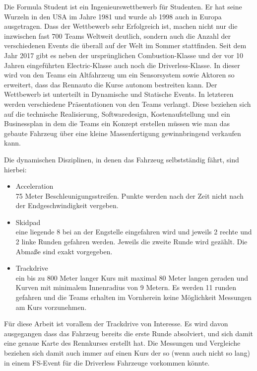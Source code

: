 \documentclass{like}
\begin{document}
Die Formula Student ist ein Ingenieurswettbewerb für Studenten. Er hat seine Wurzeln in den USA im Jahre 1981 und wurde ab 1998 auch in Europa ausgetragen.
Dass der Wettbewerb sehr Erfolgreich ist, machen nicht nur die inzwischen fast 700 Teams Weltweit \cite{FsWorldRank:1} deutlich, sondern auch die Anzahl der verschiedenen Events die überall auf der Welt im Sommer stattfinden. Seit dem Jahr 2017 gibt es neben der ursprünglichen Combustion-Klasse und der vor 10 Jahren eingeführten Electric-Klasse auch noch die Driverless-Klasse.
In dieser wird von den Teams ein Altfahrzeug um ein Sensorsystem sowie Aktoren so erweitert, dass das Rennauto die Kurse autonom bestreiten kann.
Der Wettbewerb ist unterteilt in Dynamische und Statische Events. In letzteren werden verschiedene Präsentationen von den Teams verlangt. Diese beziehen sich auf die technische Realisierung, Softwaredesign, Kostenaufstellung und ein Businessplan in dem die Teams ein Konzept erstellen müssen wie man das gebaute Fahrzeug über eine kleine Massenfertigung gewinnbringend verkaufen kann.

Die dynamischen Disziplinen, in denen das Fahrzeug selbstständig fährt, sind hierbei:
\begin{itemize}
	\item Acceleration \\ 75 Meter Beschleunigungsstreifen. Punkte werden nach der Zeit nicht nach der Endgeschwindigkeit vergeben.
	\item Skidpad \\ eine liegende 8 bei an der Engstelle eingefahren wird und jeweils 2 rechte und 2 linke Runden gefahren werden. Jeweils die zweite Runde wird gezählt. Die Abmaße sind exakt vorgegeben.
	\item Trackdrive \\ ein bis zu 800 Meter langer Kurs mit maximal 80 Meter langen geraden und Kurven mit minimalem Innenradius von 9 Metern. Es werden 11 runden gefahren und die Teams erhalten im Vornherein keine Möglichkeit Messungen am Kurs vorzunehmen.
\end{itemize}

Für diese Arbeit ist vorallem der Trackdrive von Interesse. Es wird davon ausgegangen dass das Fahrzeug bereits die erste Runde absolviert, und sich damit eine genaue Karte des Rennkurses erstellt hat. Die Messungen und Vergleiche beziehen sich damit auch immer auf einen Kurs der so (wenn auch nicht so lang) in einem FS-Event für die Driverless Fahrzeuge vorkommen könnte.
 

\section{}
\end{document}
